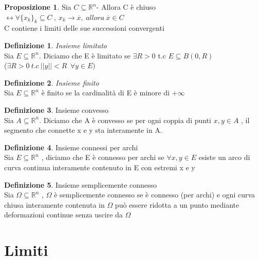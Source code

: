 \documentclass{article}
\theoremstyle{definition}
\newtheorem*{definizione}{Definizione}
\newtheorem*{proposizione}{Proposizione}
\newcommand{\R}{\mathbb{R}}
\newcommand{\Rn}{\R^n}
\begin{document}
	\begin{proposizione}
		Sia $C \subseteq \Rn$- Allora C è chiuso $\leftrightarrow \forall \{x_k\}_k \subseteq C \ ,\ x_k \rightarrow \overline{x} , \ allora \ \overline{x} \in C $ \\
		C contiene i limiti delle sue successioni convergenti 
	\end{proposizione}
	\begin{definizione}
		\textit{Insieme limitato \\
		}  Sia $ E \subseteq \Rn$. Diciamo che E è limitato se $\exists R > 0 $ t.c $E \subseteq B(0,R)$\\ ($\exists R > 0 \ t.c \ ||y|| < R \ \ \forall y \in E)$
	\end{definizione}
	\begin{definizione}
		\textit{    Insieme finito \\
		}    Sia $E\subseteq \Rn$ è finito se la cardinalità di E è minore di +$\infty$
	\end{definizione}
	\begin{definizione}
		Insieme convesso \\ \label{def:1}
		Sia $A \subseteq \Rn$. Diciamo che A è convesso se per ogni coppia di punti $x,y \in A$ , il segmento che connette x e y sta interamente in A.
	\end{definizione}
	\begin{definizione}
		Insieme connessi per archi \\ \label{def:2}
		Sia $E \subseteq \Rn$ , diciamo che E è connesso per  archi se $\forall x,y \in E $ esiste un arco di curva continua interamente contenuto in E con estremi x e y 
	\end{definizione}
	\begin{definizione}
		Insieme semplicemente connesso\\
		Sia $\Omega \subseteq \R^n$ , $\Omega$ è semplicemente connesso se è connesso (per archi) e ogni curva chiusa interamente contenuta in $\Omega$ può essere ridotta a un punto mediante deformazioni continue senza uscire da $\Omega$
	\end{definizione}
	\section{Limiti}
	
\end{document}
